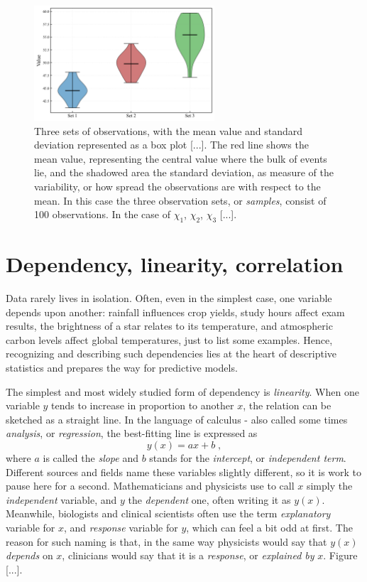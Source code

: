 \documentclass{book}
\begin{document}
\begin{figure}[ht]
    \centering
    \includegraphics[width=0.6\textwidth]{figures/chapter1/measurements_violin.png}
    \caption{Three sets of observations, with the mean value and standard deviation represented as a box plot [...]. The red line shows the mean value, representing the central value where the bulk of events lie, and the shadowed area the standard deviation, as measure of the variability, or how spread the observations are with respect to the mean. In this case the three observation sets, or \textit{samples}, consist of 100 observations. In the case of $\chi_1$, $\chi_2$, $\chi_3$ [...].}
    \label{fig:histogram1}
\end{figure}

\section{Dependency, linearity, correlation}

Data rarely lives in isolation. Often, even in the simplest case, one variable depends upon another: rainfall influences crop yields, study hours affect exam results, the brightness of a star relates to its temperature, and atmospheric carbon levels affect global temperatures, just to list some examples. Hence, recognizing and describing such dependencies lies at the heart of descriptive statistics and prepares the way for predictive models.

\medskip

The simplest and most widely studied form of dependency is \textit{linearity}. When one variable $y$ tends to increase in proportion to another $x$, the relation can be sketched as a straight line. In the language of calculus - also called some times \textit{analysis}, or \textit{regression}, the best-fitting line is expressed as
\begin{equation}
	y(x) = a x + b \; ,
	\label{eq:linear}
\end{equation}
where $a$ is called the \textit{slope} and $b$ stands for the \textit{intercept}, or \textit{independent term}. Different sources and fields name these variables slightly different, so it is work to pause here for a second. Mathematicians and physicists use to call $x$ simply the \textit{independent} variable, and $y$ the \textit{dependent} one, often writing it as $y(x)$. Meanwhile, biologists and clinical scientists often use the term \textit{explanatory} variable for $x$, and \textit{response} variable for $y$, which can feel a bit odd at first. The reason for such naming is that, in the same way physicists would say that $y(x)$ \textit{depends} on $x$, clinicians would say that it is a \textit{response}, or \textit{explained by} $x$. Figure [...].
\end{document}
